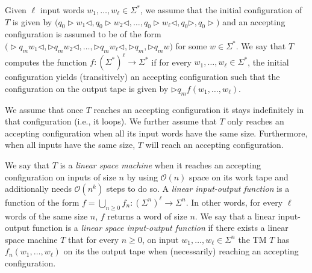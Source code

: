 Given $\ell$ input words $w_1,\ldots,w_\ell\in\Sigma^*$, we assume that the initial configuration of 
$T$ is given by
$\bigl(q_0\rhd  w_1\lhd,q_0\rhd w_2\lhd,\ldots, q_0\rhd w_\ell\lhd,q_0\rhd, q_0\rhd \bigr)$ and an 
accepting configuration is assumed to be of the form 
$\bigl(\rhd q_m w_1\lhd,\rhd q_m w_2\lhd,\ldots, \rhd q_m w_\ell\lhd,\rhd q_m,\rhd q_m w\bigr)$ for some
$w\in\Sigma^*$. We say that $T$ computes the function $f:(\Sigma^*)^{\ell}\to\Sigma^*$ if for every
$w_1,\ldots,w_\ell\in\Sigma^*$, the initial configuration yields (transitively) an accepting 
configuration such that the configuration on the output tape is
given by $\rhd q_m f(w_1,\ldots,w_\ell)$.

We assume that once $T$ reaches an accepting configuration it stays indefinitely in that configuration 
(i.e., it loops). We further assume that $T$ only reaches an accepting configuration when all its input
words have the same size. Furthermore, when all inputs have the same size, $T$ will reach an accepting 
configuration. 


We say that $T$ is a \textit{linear space machine} when it reaches an accepting configuration 
on inputs of size $n$ by using $\mathcal{O}(n)$ space on its work tape and additionally needs 
$\mathcal{O}(n^k)$ steps to do so. A \textit{linear input-output function} is a function of the form 
$f=\bigcup_{n\geq 0} f_n:(\Sigma^n)^\ell\to\Sigma^n$. In other words, for every $\ell$ words of the same 
size $n$, $f$ returns a word of size $n$. We say that a linear input-output function is a 
\textit{linear space input-output function} if
there exists a linear space machine  $T$ that for every $n\geq 0$, on input $w_1,\ldots,w_\ell\in\Sigma^n$ 
the TM $T$ has
$f_n(w_1,\ldots,w_\ell)$ on its the output tape when (necessarily) reaching an accepting configuration.

